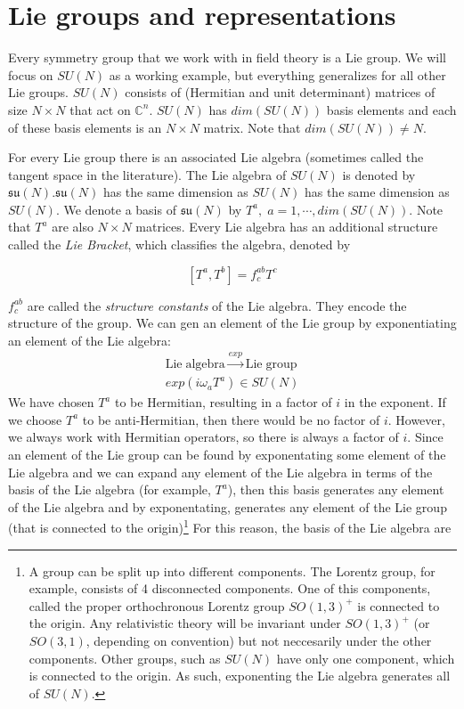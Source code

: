 \section{Lie groups and representations}
Every symmetry group that we work with in field theory is a Lie group.
We will focus on $SU(N)$ as a working example, but everything generalizes
for all other Lie groups. $SU(N)$ consists of (Hermitian and unit determinant)
matrices of size $N\times N$ that act on $\mathbb{C}^n$. $SU(N)$ has
$dim(SU(N))$ basis elements and each of these basis elements is an $N\times N$
matrix. Note that $dim(SU(N))\neq N.$
\par For every Lie group there is an associated Lie algebra (sometimes called
the tangent space in the literature). The Lie algebra of $SU(N)$ is denoted by
$\mathfrak{su}(N)$.$\mathfrak{su}(N)$ has the same dimension as $SU(N)$ has the
same dimension as $SU(N)$. We denote a basis of $\mathfrak{su}(N)$ by
$T^a,\;a=1,\cdots,dim(SU(N))$. Note that $T^a$ are also $N\times N$ matrices.
Every Lie algebra has an additional structure called the \textit{Lie Bracket},
which classifies the algebra, denoted by
\begin{definition}
  \begin{equation}
    \left[T^a, T^b\right]=f^{ab}_cT^c
  \end{equation}
\end{definition}
$f^{ab}_c$ are called the \textit{structure constants} of the Lie algebra. They
encode the structure of the group. We can gen an element of the Lie group by
exponentiating an element of the Lie algebra:
\begin{gather}
  \mathrm{Lie\; algebra}\xrightarrow{exp}\mathrm{Lie\; group}\nonumber\\
  exp(i\omega_aT^a)\in SU(N)
\end{gather}
We have chosen $T^a$ to be Hermitian, resulting in a factor of $i$ in the
exponent. If we choose $T^a$ to be anti-Hermitian, then there would be no
factor of $i$. However, we always work with Hermitian operators, so there is
always a factor of $i$. Since an element of the Lie group can be found by
exponentating some element of the Lie algebra and we can expand any element of
the Lie algebra in terms of the basis of the Lie algebra (for example, $T^a$),
then this basis generates any element of the Lie algebra and by exponentating,
generates any element of the Lie group (that is connected to the
origin)\footnote{A group can be split up into different components. The Lorentz
  group, for example, consists of 4 disconnected components. One of this
  components, called the proper orthochronous Lorentz group $SO(1,3)^+$ is
  connected to the origin. Any relativistic theory will be invariant under
  $SO(1,3)^+$ (or $SO(3,1)$, depending on convention) but not neccesarily under
  the other components. Other groups, such as $SU(N)$ have only one component,
  which is connected to the origin. As such, exponenting the Lie algebra
generates all of $SU(N)$.} For this reason, the basis of the Lie algebra are
